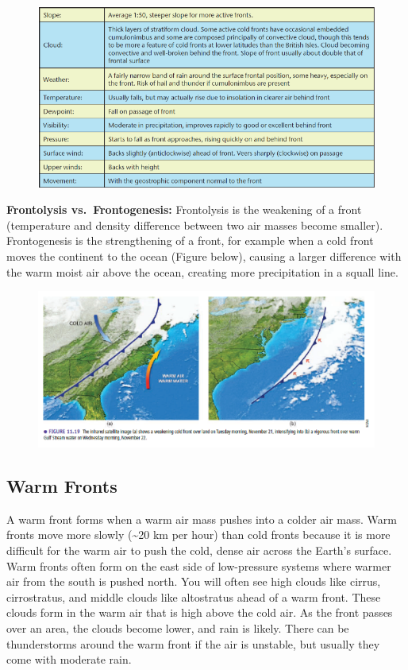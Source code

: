 \documentclass[12pt,oneside]{book}
\begin{document}
\begin{figure}

{\centering \includegraphics[width=0.8\linewidth]{figures/Figure623c} 

}

\caption{ }\label{fig:Fig623c}
\end{figure}

\textbf{Frontolysis vs.~Frontogenesis:} Frontolysis is the weakening of
a front (temperature and density difference between two air masses
become smaller). Frontogenesis is the strengthening of a front, for
example when a cold front moves the continent to the ocean (Figure
below), causing a larger difference with the warm moist air above the
ocean, creating more precipitation in a squall line.

\begin{figure}

{\centering \includegraphics[width=0.8\linewidth]{figures/Figure623d} 

}

\caption{ }\label{fig:Fig623d}
\end{figure}

\subsection{Warm Fronts}\label{warm-fronts}

A warm front forms when a warm air mass pushes into a colder air mass.
Warm fronts move more slowly (\textasciitilde{}20 km per hour) than cold
fronts because it is more difficult for the warm air to push the cold,
dense air across the Earth's surface. Warm fronts often form on the east
side of low-pressure systems where warmer air from the south is pushed
north. You will often see high clouds like cirrus, cirrostratus, and
middle clouds like altostratus ahead of a warm front. These clouds form
in the warm air that is high above the cold air. As the front passes
over an area, the clouds become lower, and rain is likely. There can be
thunderstorms around the warm front if the air is unstable, but usually
they come with moderate rain.
\end{document}
